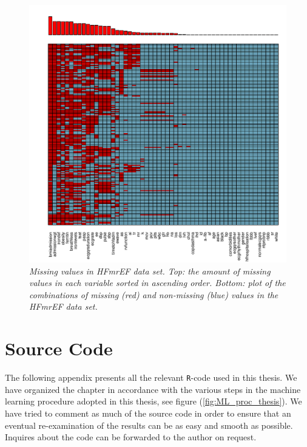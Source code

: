 \documentclass[../thesis.tex]{subfiles}
\begin{document}
\begin{figure}[h!]
    \centering
    \hspace*{-1cm}\includegraphics[width=1.1\textwidth]{doc/thesis/images/HFmrEF_miss_dist.pdf}
    \caption[Missing values in HFmrEF data set]{\textit{Missing values in HFmrEF data set. Top:  the amount of missing values in each variable sorted in ascending order. Bottom: plot of the combinations of missing (red) and non-missing (blue) values in the HFmrEF data set.}}
    \label{fig:HFmrEF_missing}
\end{figure}

\newpage

\chapter{Source Code}
\label{chap:souce_code}

\noindent The following appendix presents all the relevant \texttt{R}-code used in this thesis. We have organized the chapter in accordance with the various steps in the machine learning procedure adopted in this thesis, see figure (\ref{fig:ML_proc_thesis}). We have tried to comment as much of the source code in order to ensure that an eventual re-examination of the results can be as easy and smooth as possible. Inquires about the code can be forwarded to the author on request.
\end{document}
